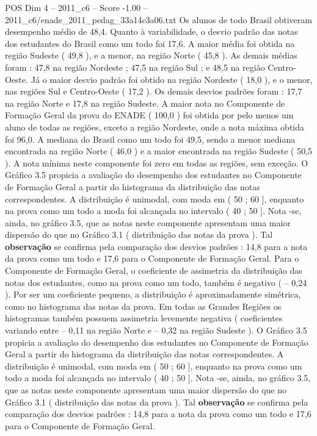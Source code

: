 \begin{textsample}{POS Dim 4 – 2011\_c6 – Score -1.00 – 2011\_c6/enade\_2011\_pedag\_33a14c3a06.txt}
Os alunos de todo Brasil obtiveram desempenho médio de 48,4.
Quanto à variabilidade, o desvio padrão das notas dos estudantes do Brasil como um todo foi 17,6.
A maior média foi obtida na região Sudeste ( 49,8 ), e a menor, na região Norte ( 45,8 ).
As demais médias foram : 47,8 na região Nordeste ; 47,5 na região Sul ; e 48,5 na região Centro-Oeste.
Já o maior desvio padrão foi obtido na região Nordeste ( 18,0 ), e o menor, nas regiões Sul e Centro-Oeste ( 17,2 ).
Os demais desvios padrões foram : 17,7 na região Norte e 17,8 na região Sudeste.
A maior nota no Componente de Formação Geral da prova do ENADE ( 100,0 ) foi obtida por pelo menos um aluno de todas as regiões, exceto a região Nordeste, onde a nota máxima obtida foi 96,0.
A mediana do Brasil como um todo foi 49,5, sendo a menor mediana encontrada na região Norte ( 46,0 ) e a maior encontrada na região Sudeste ( 50,5 ).
A nota mínima neste componente foi zero em todas as regiões, sem exceção.
O Gráfico 3.5 propicia a avaliação do desempenho dos estudantes no Componente de Formação Geral a partir do histograma da distribuição das notas correspondentes.
A distribuição é unimodal, com moda em ( 50 ; 60 ], enquanto na prova como um todo a moda foi alcançada no intervalo ( 40 ; 50 ].
Nota -se, ainda, no gráfico 3.5, que as notas neste componente apresentam uma maior dispersão do que no Gráfico 3.1 ( distribuição das notas da prova ).
Tal \textbf{observação} se confirma pela comparação dos desvios padrões : 14,8 para a nota da prova como um todo e 17,6 para o Componente de Formação Geral.
Para o Componente de Formação Geral, o coeficiente de assimetria da distribuição das notas dos estudantes, como na prova como um todo, também é negativo ( – 0,24 ).
Por ser um coeficiente pequeno, a distribuição é aproximadamente simétrica, como no histograma das notas da prova.
Em todas as Grandes Regiões os histogramas também possuem assimetria levemente negativa ( coeficientes variando entre – 0,11 na região Norte e – 0,32 na região Sudeste ).
O Gráfico 3.5 propicia a avaliação do desempenho dos estudantes no Componente de Formação Geral a partir do histograma da distribuição das notas correspondentes.
A distribuição é unimodal, com moda em ( 50 ; 60 ], enquanto na prova como um todo a moda foi alcançada no intervalo ( 40 ; 50 ].
Nota -se, ainda, no gráfico 3.5, que as notas neste componente apresentam uma maior dispersão do que no Gráfico 3.1 ( distribuição das notas da prova ).
Tal \textbf{observação} se confirma pela comparação dos desvios padrões : 14,8 para a nota da prova como um todo e 17,6 para o Componente de Formação Geral.

\end{textsample}
